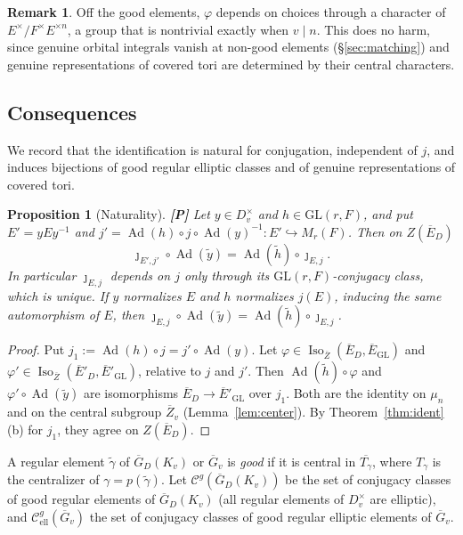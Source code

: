 \documentclass[12pt]{article}
\newcommand{\ov}[1]{\overline{#1}}
\newcommand{\Ad}{\operatorname{Ad}}
\newcommand{\Iso}{\operatorname{Iso}}
\newcommand{\GL}{\mathrm{GL}}
\newcommand{\Gb}{\ov{G}}
\newcommand{\Zb}{\ov{Z}}
\newcommand{\GDb}{\ov{G}_D}
\newcommand{\Eb}{\ov{E}}
\newcommand{\jj}{\jmath}
\newcommand{\Pv}{\textbf{[P]}}
\theoremstyle{plain}
\newtheorem{proposition}[theorem]{Proposition}
\theoremstyle{definition}
\newtheorem{remark}[theorem]{Remark}
\begin{document}
\begin{remark}
Off the good elements, $\varphi$ depends on choices through a character of $E^\times/F^\times E^{\times n}$, a group that is nontrivial exactly when $v\mid n$. This does no harm, since genuine orbital integrals vanish at non-good elements (\S\ref{sec:matching}) and genuine representations of covered tori are determined by their central characters.
\end{remark}

\subsection{Consequences}\label{subsec:cons}
We record that the identification is natural for conjugation, independent of $j$, and induces bijections of good regular elliptic classes and of genuine representations of covered tori.

\begin{proposition}[Naturality]\label{prop:natural}\Pv
Let $y\in D_v^\times$ and $h\in\GL(r,F)$, and put $E'=yEy^{-1}$ and $j'=\Ad(h)\circ j\circ\Ad(y)^{-1}:E'\hookrightarrow M_r(F)$. Then on $Z(\Eb_D)$
\[ \jj_{E',j'}\circ\Ad(\tilde y)=\Ad(\tilde h)\circ\jj_{E,j}. \]
In particular $\jj_{E,j}$ depends on $j$ only through its $\GL(r,F)$-conjugacy class, which is unique. If $y$ normalizes $E$ and $h$ normalizes $j(E)$, inducing the same automorphism of $E$, then $\jj_{E,j}\circ\Ad(\tilde y)=\Ad(\tilde h)\circ\jj_{E,j}$.
\end{proposition}
\begin{proof}
Put $j_1:=\Ad(h)\circ j=j'\circ\Ad(y)$. Let $\varphi\in\Iso_{\Zb}(\Eb_D,\Eb_{\GL})$ and $\varphi'\in\Iso_{\Zb}(\Eb'_D,\Eb'_{\GL})$, relative to $j$ and $j'$. Then $\Ad(\tilde h)\circ\varphi$ and $\varphi'\circ\Ad(\tilde y)$ are isomorphisms $\Eb_D\to\Eb'_{\GL}$ over $j_1$. Both are the identity on $\mu_n$ and on the central subgroup $\Zb_v$ (Lemma~\ref{lem:center}). By Theorem~\ref{thm:ident}(b) for $j_1$, they agree on $Z(\Eb_D)$.
\end{proof}

A regular element $\tilde\gamma$ of $\GDb(K_v)$ or $\Gb_v$ is \emph{good} if it is central in $\ov{T_\gamma}$, where $T_\gamma$ is the centralizer of $\gamma=p(\tilde\gamma)$. Let $\mathcal C^{g}(\GDb(K_v))$ be the set of conjugacy classes of good regular elements of $\GDb(K_v)$ (all regular elements of $D_v^\times$ are elliptic), and $\mathcal C^{g}_{\mathrm{ell}}(\Gb_v)$ the set of conjugacy classes of good regular elliptic elements of $\Gb_v$.
\end{document}
